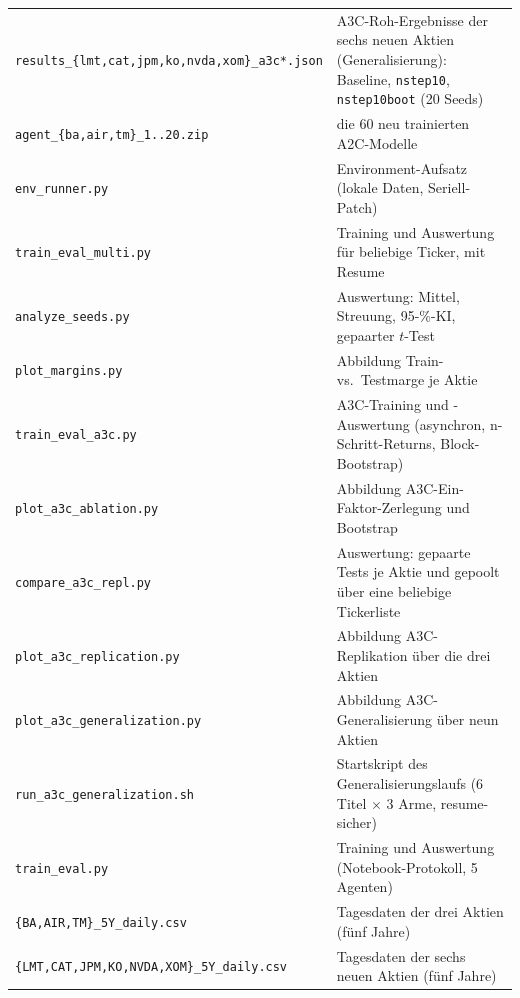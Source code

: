 \begin{table}[H]
\begin{tabular}{ll}
    \texttt{results\_\{lmt,cat,jpm,ko,nvda,xom\}\_a3c*.json} & A3C-Roh-Ergebnisse der sechs neuen Aktien (Generalisierung): Baseline, \texttt{nstep10}, \texttt{nstep10boot} (20 Seeds)\\
    \texttt{agent\_\{ba,air,tm\}\_1..20.zip} & die 60 neu trainierten A2C-Modelle\\
    \texttt{env\_runner.py}              & Environment-Aufsatz (lokale Daten, Seriell-Patch)\\
    \texttt{train\_eval\_multi.py}       & Training und Auswertung für beliebige Ticker, mit Resume\\
    \texttt{analyze\_seeds.py}           & Auswertung: Mittel, Streuung, 95-\%-KI, gepaarter $t$-Test\\
    \texttt{plot\_margins.py}            & Abbildung Train- vs.\ Testmarge je Aktie\\
    \texttt{train\_eval\_a3c.py}         & A3C-Training und -Auswertung (asynchron, n-Schritt-Returns, Block-Bootstrap)\\
    \texttt{plot\_a3c\_ablation.py}      & Abbildung A3C-Ein-Faktor-Zerlegung und Bootstrap\\
    \texttt{compare\_a3c\_repl.py}       & Auswertung: gepaarte Tests je Aktie und gepoolt über eine beliebige Tickerliste\\
    \texttt{plot\_a3c\_replication.py}   & Abbildung A3C-Replikation über die drei Aktien\\
    \texttt{plot\_a3c\_generalization.py} & Abbildung A3C-Generalisierung über neun Aktien\\
    \texttt{run\_a3c\_generalization.sh} & Startskript des Generalisierungslaufs (6 Titel $\times$ 3 Arme, resume-sicher)\\
    \texttt{train\_eval.py}              & Training und Auswertung (Notebook-Protokoll, 5 Agenten)\\
    \texttt{\{BA,AIR,TM\}\_5Y\_daily.csv} & Tagesdaten der drei Aktien (fünf Jahre)\\
    \texttt{\{LMT,CAT,JPM,KO,NVDA,XOM\}\_5Y\_daily.csv} & Tagesdaten der sechs neuen Aktien (fünf Jahre)\\
    \bottomrule
  \end{tabular}
\end{table}

